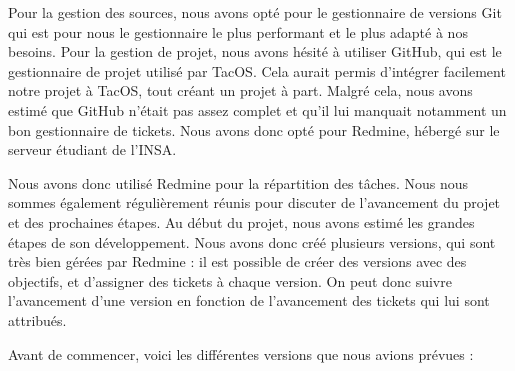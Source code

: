 Pour la gestion des sources, nous avons opté pour le gestionnaire de versions Git qui est pour nous le gestionnaire le plus performant et le plus adapté à nos besoins.
Pour la gestion de projet, nous avons hésité à utiliser GitHub, qui est le gestionnaire de projet utilisé par TacOS.
Cela aurait permis d'intégrer facilement notre projet à TacOS, tout créant un projet à part.
Malgré cela, nous avons estimé que GitHub n'était pas assez complet et qu'il lui manquait notamment un bon gestionnaire de tickets.
Nous avons donc opté pour Redmine, hébergé sur le serveur étudiant de l'INSA.

Nous avons donc utilisé Redmine pour la répartition des tâches.
Nous nous sommes également régulièrement réunis pour discuter de l'avancement du projet et des prochaines étapes.
Au début du projet, nous avons estimé les grandes étapes de son développement.
Nous avons donc créé plusieurs versions, qui sont très bien gérées par Redmine : il est possible de créer des versions avec des objectifs, et d'assigner des tickets à chaque version.
On peut donc suivre l'avancement d'une version en fonction de l'avancement des tickets qui lui sont attribués.

Avant de commencer, voici les différentes versions que nous avions prévues :

